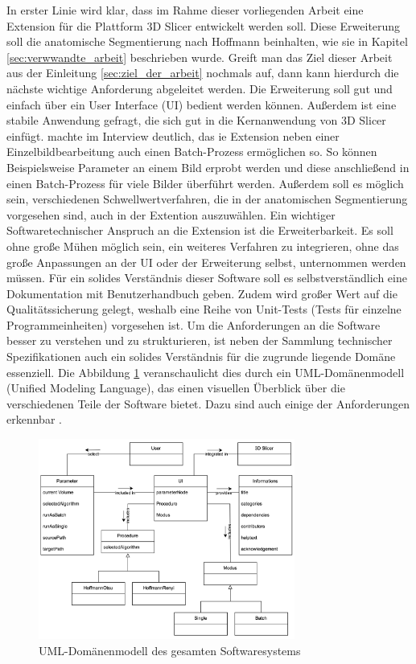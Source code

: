 In erster Linie wird klar, dass im Rahme dieser vorliegenden Arbeit eine Extension
für die Plattform 3D Slicer entwickelt werden soll. Diese Erweiterung soll die
anatomische Segmentierung nach Hoffmann \citep[vgl.][]{hoffmann2020} beinhalten,
wie sie in Kapitel \ref{sec:verwwandte_arbeit} beschrieben wurde. Greift man das
Ziel dieser Arbeit aus der Einleitung \ref{sec:ziel_der_arbeit} nochmals auf,
dann kann hierdurch die nächste wichtige Anforderung abgeleitet werden. Die Erweiterung
soll gut und einfach über ein User Interface (UI) bedient werden können.
Außerdem ist eine stabile Anwendung gefragt, die sich gut in die Kernanwendung von
3D Slicer einfügt. \citet[]{walter2025} machte im Interview deutlich, das ie
Extension neben einer Einzelbildbearbeitung auch einen Batch-Prozess ermöglichen
so. So können Beispielsweise Parameter an einem Bild erprobt werden und diese anschließend
in einen Batch-Prozess für viele Bilder überführt werden. Außerdem soll es
möglich sein, verschiedenen Schwellwertverfahren, die in der anatomischen
Segmentierung vorgesehen sind, auch in der Extention auszuwählen. Ein wichtiger
Softwaretechnischer Anspruch an die Extension ist die Erweiterbarkeit. Es soll ohne
große Mühen möglich sein, ein weiteres Verfahren zu integrieren, ohne das große Anpassungen
an der UI oder der Erweiterung selbst, unternommen werden müssen. Für ein solides
Verständnis dieser Software soll es selbstverständlich eine Dokumentation mit Benutzerhandbuch
geben. Zudem wird großer Wert auf die Qualitätssicherung gelegt, weshalb eine Reihe
von Unit-Tests (Tests für einzelne Programmeinheiten) vorgesehen ist. Um die
Anforderungen an die Software besser zu verstehen und zu strukturieren, ist neben
der Sammlung technischer Spezifikationen auch ein solides Verständnis für die zugrunde
liegende Domäne essenziell. Die Abbildung \ref{fig:3d_slicer_domäne}
veranschaulicht dies durch ein UML-Domänenmodell (Unified Modeling Language), das
einen visuellen Überblick über die verschiedenen Teile der Software bietet. Dazu
sind auch einige der Anforderungen erkennbar \citep[vgl.][]{walter2025}.

\begin{figure}[h]
	\centering
	\includegraphics[width=0.75\textwidth]{img/domaenenmodell.jpg}
	\caption{UML-Domänenmodell des gesamten Softwaresystems}
	\label{fig:3d_slicer_domäne}
\end{figure}

